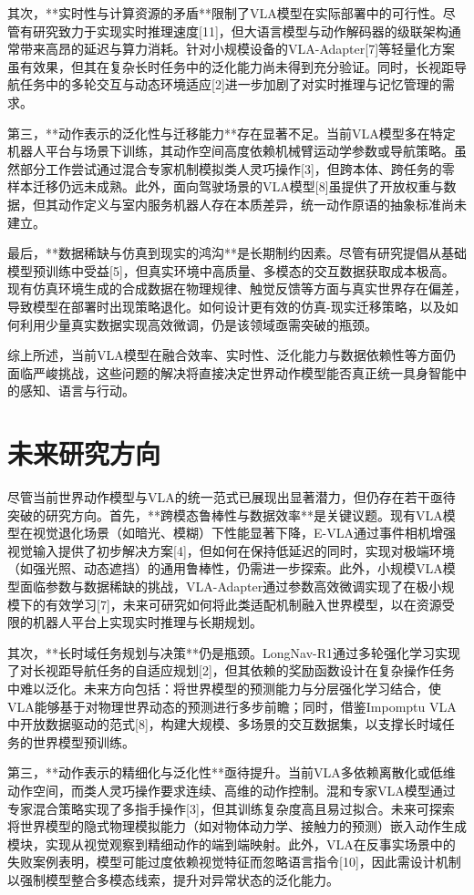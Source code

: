 \documentclass{article}
\begin{document}
其次，**实时性与计算资源的矛盾**限制了VLA模型在实际部署中的可行性。尽管有研究致力于实现实时推理速度[11]，但大语言模型与动作解码器的级联架构通常带来高昂的延迟与算力消耗。针对小规模设备的VLA-Adapter[7]等轻量化方案虽有效果，但其在复杂长时任务中的泛化能力尚未得到充分验证。同时，长视距导航任务中的多轮交互与动态环境适应[2]进一步加剧了对实时推理与记忆管理的需求。

第三，**动作表示的泛化性与迁移能力**存在显著不足。当前VLA模型多在特定机器人平台与场景下训练，其动作空间高度依赖机械臂运动学参数或导航策略。虽然部分工作尝试通过混合专家机制模拟类人灵巧操作[3]，但跨本体、跨任务的零样本迁移仍远未成熟。此外，面向驾驶场景的VLA模型[8]虽提供了开放权重与数据，但其动作定义与室内服务机器人存在本质差异，统一动作原语的抽象标准尚未建立。

最后，**数据稀缺与仿真到现实的鸿沟**是长期制约因素。尽管有研究提倡从基础模型预训练中受益[5]，但真实环境中高质量、多模态的交互数据获取成本极高。现有仿真环境生成的合成数据在物理规律、触觉反馈等方面与真实世界存在偏差，导致模型在部署时出现策略退化。如何设计更有效的仿真-现实迁移策略，以及如何利用少量真实数据实现高效微调，仍是该领域亟需突破的瓶颈。

综上所述，当前VLA模型在融合效率、实时性、泛化能力与数据依赖性等方面仍面临严峻挑战，这些问题的解决将直接决定世界动作模型能否真正统一具身智能中的感知、语言与行动。

\section{未来研究方向}

尽管当前世界动作模型与VLA的统一范式已展现出显著潜力，但仍存在若干亟待突破的研究方向。首先，**跨模态鲁棒性与数据效率**是关键议题。现有VLA模型在视觉退化场景（如暗光、模糊）下性能显著下降，E-VLA通过事件相机增强视觉输入提供了初步解决方案[4]，但如何在保持低延迟的同时，实现对极端环境（如强光照、动态遮挡）的通用鲁棒性，仍需进一步探索。此外，小规模VLA模型面临参数与数据稀缺的挑战，VLA-Adapter通过参数高效微调实现了在极小规模下的有效学习[7]，未来可研究如何将此类适配机制融入世界模型，以在资源受限的机器人平台上实现实时推理与长期规划。

其次，**长时域任务规划与决策**仍是瓶颈。LongNav-R1通过多轮强化学习实现了对长视距导航任务的自适应规划[2]，但其依赖的奖励函数设计在复杂操作任务中难以泛化。未来方向包括：将世界模型的预测能力与分层强化学习结合，使VLA能够基于对物理世界动态的预测进行多步前瞻；同时，借鉴Impomptu VLA中开放数据驱动的范式[8]，构建大规模、多场景的交互数据集，以支撑长时域任务的世界模型预训练。

第三，**动作表示的精细化与泛化性**亟待提升。当前VLA多依赖离散化或低维动作空间，而类人灵巧操作要求连续、高维的动作控制。混和专家VLA模型通过专家混合策略实现了多指手操作[3]，但其训练复杂度高且易过拟合。未来可探索将世界模型的隐式物理模拟能力（如对物体动力学、接触力的预测）嵌入动作生成模块，实现从视觉观察到精细动作的端到端映射。此外，VLA在反事实场景中的失败案例表明，模型可能过度依赖视觉特征而忽略语言指令[10]，因此需设计机制以强制模型整合多模态线索，提升对异常状态的泛化能力。
\end{document}
